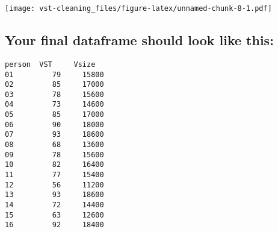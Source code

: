 \documentclass[
]{article}
\begin{document}
\texttt{[image: vst-cleaning\_files/figure-latex/unnamed-chunk-8-1.pdf]}

\hypertarget{your-final-dataframe-should-look-like-this}{%
\subsection{Your final dataframe should look like
this:}\label{your-final-dataframe-should-look-like-this}}

\begin{verbatim}
person  VST     Vsize
01         79     15800
02         85     17000
03         78     15600
04         73     14600
05         85     17000
06         90     18000
07         93     18600
08         68     13600
09         78     15600
10         82     16400
11         77     15400
12         56     11200
13         93     18600
14         72     14400
15         63     12600
16         92     18400
\end{verbatim}
\end{document}
